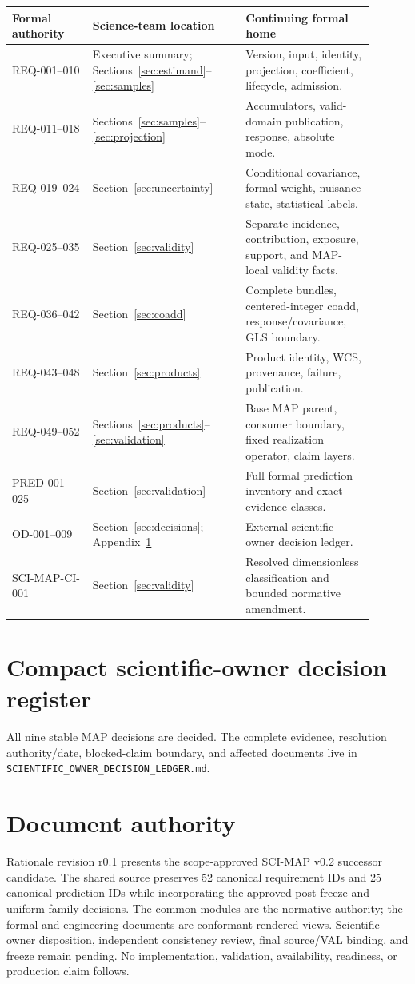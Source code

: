 \documentclass[10pt]{article}
\newcommand{\code}[1]{\nolinkurl{#1}}
\begin{document}
\begin{longtable}{L{0.20\linewidth}L{0.38\linewidth}L{0.32\linewidth}}
\toprule Formal authority & Science-team location & Continuing formal home \\
\midrule
REQ-001--010 & Executive summary; Sections~\ref{sec:estimand}--\ref{sec:samples} & Version, input, identity, projection, coefficient, lifecycle, admission.\\
REQ-011--018 & Sections~\ref{sec:samples}--\ref{sec:projection} & Accumulators, valid-domain publication, response, absolute mode.\\
REQ-019--024 & Section~\ref{sec:uncertainty} & Conditional covariance, formal weight, nuisance state, statistical labels.\\
REQ-025--035 & Section~\ref{sec:validity} & Separate incidence, contribution, exposure, support, and MAP-local validity facts.\\
REQ-036--042 & Section~\ref{sec:coadd} & Complete bundles, centered-integer coadd, response/covariance, GLS boundary.\\
REQ-043--048 & Section~\ref{sec:products} & Product identity, WCS, provenance, failure, publication.\\
REQ-049--052 & Sections~\ref{sec:products}--\ref{sec:validation} & Base MAP parent, consumer boundary, fixed realization operator, claim layers.\\
PRED-001--025 & Section~\ref{sec:validation} & Full formal prediction inventory and exact evidence classes.\\
OD-001--009 & Section~\ref{sec:decisions}; Appendix~\ref{app:decisions} & External scientific-owner decision ledger.\\
SCI-MAP-CI-001 & Section~\ref{sec:validity} & Resolved dimensionless classification and bounded normative amendment.\\
\bottomrule
\end{longtable}

\clearpage
\section{Compact scientific-owner decision register}\label{app:decisions}
All nine stable MAP decisions are decided. The complete evidence, resolution
authority/date, blocked-claim boundary, and affected documents live in
\code{SCIENTIFIC_OWNER_DECISION_LEDGER.md}.



\section{Document authority}
Rationale revision r0.1 presents the scope-approved SCI-MAP v0.2 successor
candidate. The shared source preserves 52 canonical requirement IDs and 25
canonical prediction IDs while incorporating the approved post-freeze and
uniform-family decisions. The common modules are the normative authority; the
formal and engineering documents are conformant rendered views. Scientific-
owner disposition, independent consistency review, final source/VAL binding,
and freeze remain pending. No implementation, validation, availability,
readiness, or production claim follows.
\end{document}
